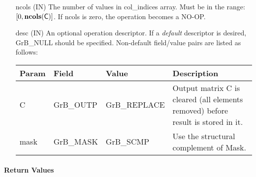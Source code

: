 \begin{itemize}[leftmargin=1.1in]
    \item[{\sf ncols}] ({\sf IN}) The number of values in {\sf col\_indices} 
	array. Must be in the range: $[0, \bold{ncols}({\sf C})]$.  If
    {\sf ncols} is zero, the operation becomes a NO-OP.

    \item[{\sf desc}] ({\sf IN}) An optional operation descriptor. If
    a \emph{default} descriptor is desired, {\sf GrB\_NULL} should be
    specified. Non-default field/value pairs are listed as follows:  \\

    \begin{tabular}{lllp{2.5in}}
    Param & Field  & Value & Description \\
    \hline
        {\sf C}    & {\sf GrB\_OUTP} & {\sf GrB\_REPLACE} & Output matrix {\sf C} 
        is cleared (all elements removed) before result is stored in it.\\
    
        {\sf mask} & {\sf GrB\_MASK} & {\sf GrB\_SCMP} & Use the structural 
        complement of {\sf Mask}. \\
    \end{tabular}

\end{itemize}

\paragraph{Return Values}

